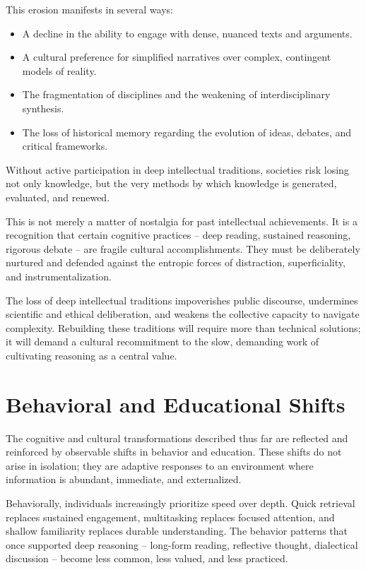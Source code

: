 This erosion manifests in several ways:

\begin{itemize}
	\item A decline in the ability to engage with dense, nuanced texts and arguments.
	\item A cultural preference	for simplified narratives over complex, contingent models of reality.
	\item The fragmentation of disciplines and the weakening of interdisciplinary synthesis.
	\item The loss of historical memory regarding the evolution of ideas, debates, and critical frameworks.
\end{itemize}

Without active participation in deep intellectual traditions, societies
risk losing not only knowledge, but the very methods by which knowledge
is generated, evaluated, and renewed.

This is not merely a matter of nostalgia for past intellectual
achievements. It is a recognition that certain cognitive practices --
deep reading, sustained reasoning, rigorous debate -- are fragile
cultural accomplishments. They must be deliberately nurtured and
defended against the entropic forces of distraction, superficiality, and
instrumentalization.

The loss of deep intellectual traditions impoverishes public discourse,
undermines scientific and ethical deliberation, and weakens the
collective capacity to navigate complexity. Rebuilding these traditions
will require more than technical solutions; it will demand a cultural
recommitment to the slow, demanding work of cultivating reasoning as a
central value.


\section{Behavioral and Educational Shifts}

The cognitive and cultural transformations described thus far are
reflected and reinforced by observable shifts in behavior and education.
These shifts do not arise in isolation; they are adaptive responses to
an environment where information is abundant, immediate, and
externalized.

Behaviorally, individuals increasingly prioritize speed over depth.
Quick retrieval replaces sustained engagement, multitasking replaces
focused attention, and shallow familiarity replaces durable
understanding. The behavior patterns that once supported deep reasoning
-- long-form reading, reflective thought, dialectical discussion -- become
less common, less valued, and less practiced.

